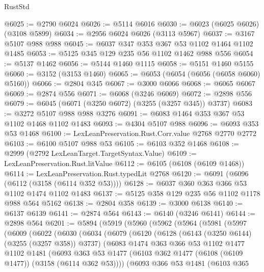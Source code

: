 \begin{lexlean}{RustStd}
\begin{coremodule}
{\begin{coremodule}
{{{{{{{{{{{{{{{{{{{{{{{{{{@6025 := @2790 @6024
@6026 := @5114 @6016
@6030 := @6023 (@6025 @6026) (@3108 @5899)
@6034 := @2956 @6024 @6026 (@3113 @5967)
@6037 := @3167 @5107 @988 @988
@6045 := @6037 @347 @353 @367 @53 @1102 @1464 @1102 @1485
@6053 := @5125 @345 @129 @235 @56 @1102 @1462 @988 @556
@6054 := @5137 @1462
@6056 := @5144 @1460 @1115
@6058 := @5151 @1460 @5155
@6060 := @3152 (@3153 @1460)
@6065 := @6053 (@6054 (@6056 (@6058 @6060) @5160))
@6066 := @2804 @345
@6067 := @3000 @6066
@6068 := @6065 @6067
@6069 := @2874 @556
@6071 := @6068 (@3246 @6069)
@6072 := @2898 @556
@6079 := @6045 (@6071 (@3250 @6072) (@3255 (@3257 @345)) @3737)
@6083 := @3272 @5107 @988 @988 @3276
@6091 := @6083 @1464 @353 @367 @53 @1102 @1468 @1102 @1483
@6093 := @4304 @5107 @988
@6096 := @6093 @353 @53 @1468
@6100 := LexLeanPreservation.Rust.Corr.value @2768 @2770 @2772
@6103 := @6100 @5107 @988 @53
@6105 := @6103 @352 @1468
@6108 := @2999 (@2792 LexLeanTarget.TargetSyntax.Value)
@6109 := LexLeanPreservation.Rust.litValue
@6112 := @6105 (@6108 (@6109 @1468))
@6114 := LexLeanPreservation.Rust.typedLit @2768
@6120 := @6091 (@6096 (@6112 (@3158 (@6114 @352 @53))))
@6128 := @6037 @360 @363 @366 @53 @1102 @1474 @1102 @1483
@6137 := @5125 @358 @129 @235 @56 @1102 @1178 @988 @564 @5162
@6138 := @2804 @358
@6139 := @3000 @6138
@6140 := @6137 @6139
@6141 := @2874 @564
@6143 := @6140 (@3246 @6141)
@6144 := @2898 @564
@6201 := @5894
    (@5919
      (@5960
        (@5962
          (@5964
            (@5981
              (@5997
                (@6009
                  (@6022
                    (@6030
                      (@6034
                        (@6079
                          (@6120
                            (@6128
                              (@6143 (@3250 @6144) (@3255 (@3257 @358)) @3737)
                              (@6083
                                @1474
                                @363
                                @366
                                @53
                                @1102
                                @1477
                                @1102
                                @1481
                                (@6093
                                  @363
                                  @53
                                  @1477
                                  (@6103 @362 @1477 (@6108 (@6109 @1477)) (@3158 (@6114 @362 @53))))
                                (@6093
                                  @366
                                  @53
                                  @1481
                                  (@6103
                                    @365
}}}}}}}}}}}}}}}}}}}}}}}}}}
\end{coremodule}}
\end{coremodule}
\end{lexlean}
